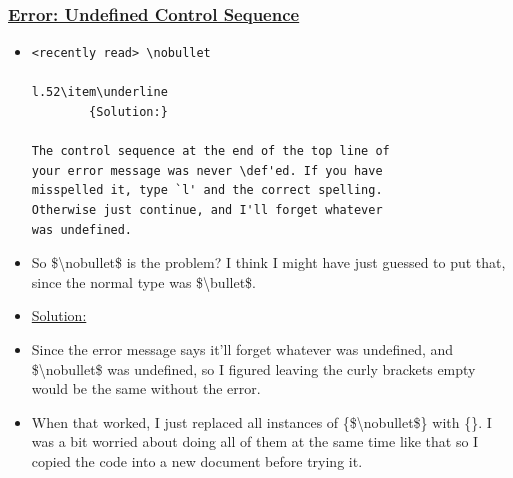 \documentclass[12pt]{article}
\begin{document}
\subsubsection{\texorpdfstring{\underline{Error: Undefined Control Sequence}}{}}\label{error:er14}
\begin{itemize}
    \item\begin{verbatim}
<recently read> \nobullet
        
l.52\item\underline
        {Solution:}
            
The control sequence at the end of the top line of 
your error message was never \def'ed. If you have 
misspelled it, type `l' and the correct spelling. 
Otherwise just continue, and I'll forget whatever 
was undefined.
    \end{verbatim}
    \item So \$\textbackslash nobullet\$ is the problem? I think I might have just guessed to put that, since the normal type was \$\textbackslash bullet\$. 
\end{itemize}
\begin{itemize}
\renewcommand{\labelitemi}{}
    \item \underline{Solution:}
\end{itemize}
\renewcommand{\labelitemi}{$\bullet$}
\begin{itemize}
    \item Since the error message says it'll forget whatever was undefined, and \$\textbackslash nobullet\$ was undefined, so I figured leaving the curly brackets empty would be the same without the error.
    \item When that worked, I just replaced all instances of \{\$\textbackslash nobullet\$\} with \{\}. I was a bit worried about doing all of them at the same time like that so I copied the code into a new document before trying it. 
\end{itemize}
\end{document}

